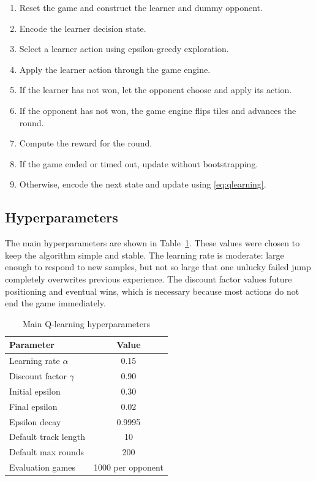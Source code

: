 \documentclass[conference]{IEEEtran}
\begin{document}
\begin{enumerate}
\item Reset the game and construct the learner and dummy opponent.
\item Encode the learner decision state.
\item Select a learner action using epsilon-greedy exploration.
\item Apply the learner action through the game engine.
\item If the learner has not won, let the opponent choose and apply its action.
\item If the opponent has not won, the game engine flips tiles and advances the
round.
\item Compute the reward for the round.
\item If the game ended or timed out, update without bootstrapping.
\item Otherwise, encode the next state and update using \eqref{eq:qlearning}.
\end{enumerate}

\subsection{Hyperparameters}

The main hyperparameters are shown in Table~\ref{tab:hyper}. These values were
chosen to keep the algorithm simple and stable. The learning rate is moderate:
large enough to respond to new samples, but not so large that one unlucky failed
jump completely overwrites previous experience. The discount factor values future
positioning and eventual wins, which is necessary because most actions do not end
the game immediately.

\begin{table}[h]
\centering
\caption{Main Q-learning hyperparameters}
\label{tab:hyper}
\begin{tabular}{lc}
\toprule
Parameter & Value \\
\midrule
Learning rate $\alpha$ & 0.15 \\
Discount factor $\gamma$ & 0.90 \\
Initial epsilon & 0.30 \\
Final epsilon & 0.02 \\
Epsilon decay & 0.9995 \\
Default track length & 10 \\
Default max rounds & 200 \\
Evaluation games & 1000 per opponent \\
\bottomrule
\end{tabular}
\end{table}
\end{document}
